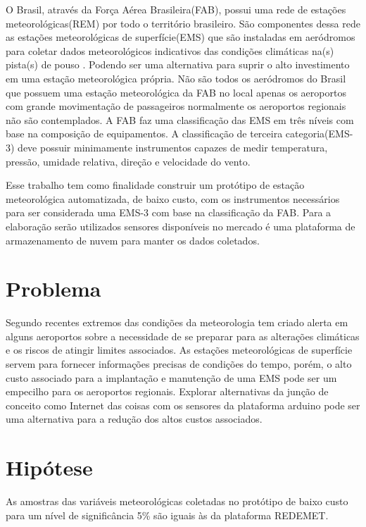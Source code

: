 O Brasil, através da Força Aérea Brasileira(FAB), possui uma rede de estações meteorológicas(REM) por todo o território brasileiro. São componentes dessa rede as estações meteorológicas de superfície(EMS) que são instaladas em aeródromos para coletar dados meteorológicos indicativos das condições climáticas na(s) pista(s) de pouso \cite{henrique2005meteorologia}. Podendo ser uma alternativa para suprir o alto investimento em uma estação meteorológica própria.
Não são todos os aeródromos do Brasil que possuem uma estação meteorológica da FAB no local apenas os aeroportos com grande movimentação de passageiros normalmente os aeroportos regionais não são contemplados. A FAB faz uma classificação das EMS em três níveis com base na composição de equipamentos. A classificação de terceira categoria(EMS-3) deve possuir minimamente instrumentos capazes de medir temperatura, pressão, umidade relativa, direção e velocidade do vento.\cite{BRASILMCA101}

Esse trabalho tem como finalidade construir um protótipo de estação meteorológica automatizada, de baixo custo, com os instrumentos necessários para ser considerada uma EMS-3 com base na classificação da FAB. Para a elaboração serão utilizados sensores disponíveis no mercado é uma plataforma de armazenamento de nuvem para manter os dados coletados. 



\section{Problema}

 Segundo \cite{hileman2014critical} recentes extremos das condições da meteorologia tem criado alerta em alguns aeroportos sobre a necessidade de se preparar para as alterações climáticas e os riscos de atingir limites associados. As estações meteorológicas de superfície servem para fornecer informações precisas de condições do tempo, porém, o alto custo associado para a implantação e manutenção de uma EMS pode ser um empecilho para os aeroportos regionais. Explorar alternativas da junção de conceito como Internet das coisas com os sensores da plataforma arduino pode ser uma alternativa para a redução dos altos custos associados. 


\section{Hipótese}

As amostras das variáveis meteorológicas coletadas no protótipo de baixo custo para um nível de significância 5\% são iguais às da plataforma REDEMET.


